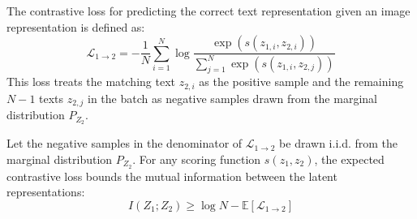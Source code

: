The contrastive loss for predicting the correct text representation given an image representation is defined as:
\begin{equation}
    \mathcal{L}_{1 \to 2} = - \frac{1}{N} \sum_{i=1}^N \log \frac{\exp(s(z_{1,i}, z_{2,i}))}{\sum_{j=1}^N \exp(s(z_{1,i}, z_{2,j}))}
\end{equation}
This loss treats the matching text $z_{2,i}$ as the positive sample and the remaining $N-1$ texts $z_{2,j}$ in the batch as negative samples drawn from the marginal distribution $P_{Z_2}$.

\begin{theorem}
Let the negative samples in the denominator of $\mathcal{L}_{1 \to 2}$ be drawn i.i.d. from the marginal distribution $P_{Z_2}$. For any scoring function $s(z_1, z_2)$, the expected contrastive loss bounds the mutual information between the latent representations:
\begin{equation}
    I(Z_1; Z_2) \ge \log N - \mathbb{E}\left[\mathcal{L}_{1 \to 2}\right]
\end{equation}
\end{theorem}

